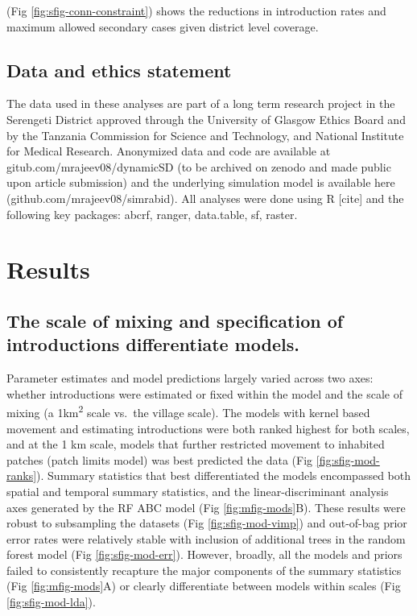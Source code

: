 \documentclass[
]{book}
\begin{document}
(Fig \ref{fig:sfig-conn-constraint}) shows the reductions in introduction rates and maximum allowed secondary cases given district level coverage.

\hypertarget{data-and-ethics-statement}{%
\subsection{Data and ethics statement}\label{data-and-ethics-statement}}

The data used in these analyses are part of a long term research project in the Serengeti District approved through the University of Glasgow Ethics Board and by the Tanzania Commission for Science and Technology, and National Institute for Medical Research. Anonymized data and code are available at gitub.com/mrajeev08/dynamicSD (to be archived on zenodo and made public upon article submission) and the underlying simulation model is available here (github.com/mrajeev08/simrabid). All analyses were done using R {[}cite{]} and the following key packages: abcrf, ranger, data.table, sf, raster.

\hypertarget{results-2}{%
\section{Results}\label{results-2}}

\hypertarget{the-scale-of-mixing-and-specification-of-introductions-differentiate-models.}{%
\subsection{The scale of mixing and specification of introductions differentiate models.}\label{the-scale-of-mixing-and-specification-of-introductions-differentiate-models.}}

Parameter estimates and model predictions largely varied across two axes: whether introductions were estimated or fixed within the model and the scale of mixing (a 1km\textsuperscript{2} scale vs.~the village scale). The models with kernel based movement and estimating introductions were both ranked highest for both scales, and at the 1 km scale, models that further restricted movement to inhabited patches (patch limits model) was best predicted the data (Fig \ref{fig:sfig-mod-ranks}). Summary statistics that best differentiated the models encompassed both spatial and temporal summary statistics, and the linear-discriminant analysis axes generated by the RF ABC model (Fig \ref{fig:mfig-mods}B). These results were robust to subsampling the datasets (Fig \ref{fig:sfig-mod-vimp}) and out-of-bag prior error rates were relatively stable with inclusion of additional trees in the random forest model (Fig \ref{fig:sfig-mod-err}). However, broadly, all the models and priors failed to consistently recapture the major components of the summary statistics (Fig \ref{fig:mfig-mods}A) or clearly differentiate between models within scales (Fig \ref{fig:sfig-mod-lda}).
\end{document}
